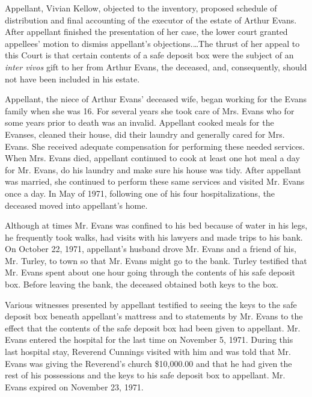 
Appellant, Vivian Kellow, objected to the inventory, proposed schedule of
distribution and final accounting of the executor of the estate of Arthur
Evans. After appellant finished the presentation of her case, the lower court
granted appellees' motion to dismiss appellant's objections.\dots The thrust
of her appeal to this Court is that certain contents of a safe deposit box were
the subject of an \textit{inter vivos} gift to her from Arthur Evans, the
deceased, and, consequently, should not have been included in his estate. 

Appellant, the niece of Arthur Evans' deceased wife, began working for the Evans
family when she was 16. For several years she took care of Mrs. Evans who for
some years prior to death was an invalid. Appellant cooked meals for the
Evanses, cleaned their house, did their laundry and generally cared for Mrs.
Evans. She received adequate compensation for performing these needed services.
When Mrs. Evans died, appellant continued to cook at least one hot meal a day
for Mr. Evans, do his laundry and make sure his house was tidy. After appellant
was married, she continued to perform these same services and visited Mr. Evans
once a day. In May of 1971, following one of his four hospitalizations, the
deceased moved into appellant's home. 

Although at times Mr. Evans was confined to his bed because of water in his
legs, he frequently took walks, had visits with his lawyers and made trips to
his bank. On October 22, 1971, appellant's husband drove Mr. Evans and a friend
of his, Mr. Turley, to town so that Mr. Evans might go to the bank. Turley
testified that Mr. Evans spent about one hour going through the contents of his
safe deposit box. Before leaving the bank, the deceased obtained both keys to
the box. 

Various witnesses presented by appellant testified to seeing the keys to the
safe deposit box beneath appellant's mattress and to statements by Mr. Evans to
the effect that the contents of the safe deposit box had been given to
appellant. Mr. Evans entered the hospital for the last time on November 5,
1971. During this last hospital stay, Reverend Cunnings visited with him and
was told that Mr. Evans was giving the Reverend's church \$10,000.00 and that
he had given the rest of his possessions and the keys to his safe deposit box
to appellant. Mr. Evans expired on November 23, 1971. 

